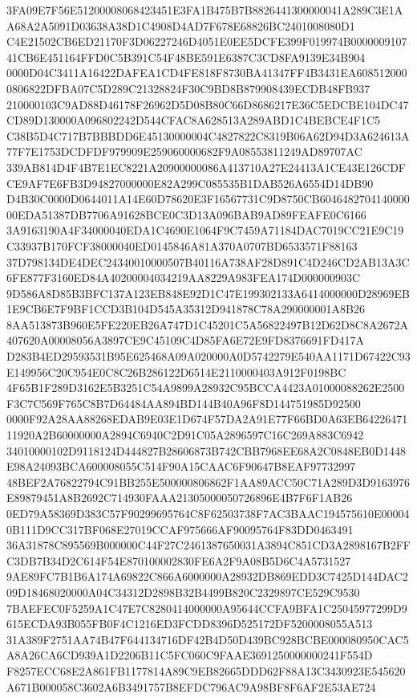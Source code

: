 \documentclass[UTF8,fontset=fandol,zihao=-4,a4paper]{ctexart}
\begin{document}
{{3FA09E7F56E51200008068423451E3FA1B475B7B8826441300000041A289C3E1AA68A2A5091D03638A38D1C4908D4AD7F678E68826BC2401008080D1
C4E21502CB6ED21170F3D06227246D4051E0EE5DCFE399F019974B000000910741CB6E451164FFD0C5B391C54F48BE591E6387C3CD8FA9139E34B904
0000D04C3411A16422DAFEA1CD4FE818F8730BA41347FF4B3431EA6085120000806822DFBA07C5D289C21328824F30C9BD8B879908439ECDB48FB937
210000103C9AD88D46178F26962D5D08B80C66D8686217E36C5EDCBE104DC47CD89D130000A096802242D544CFAC8A628513A289ABD1C4BEBCE4F1C5
C38B5D4C717B7BBBDD6E45130000004C4827822C8319B06A62D94D3A624613A77F7E1753DCDFDF979909E259060000682F9A08553811249AD89707AC
339AB814D4F4B7E1EC8221A20900000086A413710A27E24413A1CE43E126CDFCE9AF7E6FB3D94827000000E82A299C085535B1DAB526A6554D14DB90
D4B30C0000D0644011A14E60D78620E3F16567731C9D8750CB604648270414000000EDA51387DB7706A91628BCE0C3D13A096BAB9AD89FEAFE0C6166
3A9163190A4F34000040EDA1C4690E1064F9C7459A71184DAC7019CC21E9C19C33937B170FCF38000040ED0145846A81A370A0707BD6533571F88163
37D798134DE4DEC24340010000507B40116A738AF28D891C4D246CD2AB13A3C6FE877F3160ED84A40200004034219AA8229A983FEA174D000000903C
9D586A8D85B3BFC137A123EB848E92D1C47E199302133A6414000000D28969EB1E9CB6E7F9BF1CCD3B104D545A35312D941878C78A290000001A8B26
8AA513873B960E5FE220EB26A747D1C45201C5A56822497B12D62D8C8A2672A407620A00008056A3897CE9C45109C4D85FA6E72E9FD8376691FD417A
D283B4ED29593531B95E625468A09A020000A0D5742279E540AA1171D67422C93E149956C20C954E0C8C26B286122D6514E2110000403A912F0198BC
4F65B1F289D3162E5B3251C54A9899A28932C95BCCA4423A01000088262E2500F3C7C569F765C8B7D64484AA894BD144B40A96F8D144751985D92500
0000F92A28AA88268EDAB9E03E1D674F57DA2A91E77F66BD0A63EB6422647111920A2B60000000A2894C6940C2D91C05A2896597C16C269A883C6942
34010000102D9118124D444827B28606873B742CBB7968EE68A2C0848EB0D1448E98A24093BCA600008055C514F90A15CAAC6F90647B8EAF97732997
48BEF2A76822794C91BB255E500000806862F1AA89ACC50C71A289D3D9163976E89879451A8B2692C714930FAAA21305000050726896E4B7F6F1AB26
0ED79A58369D383C57F90299695764C8F62503738F7AC3BAAC194575610E000040B111D9CC317BF068E27019CCAF975666AF90095764F83DD0463491
36A31878C895569B000000C44F27C2461387650031A3894C851CD3A2898167B2FFC3DB7B34D2C614F54E870100002830FE6A2F9A08B5D6C4A5731527
9AE89FC7B1B6A174A69822C866A6000000A28932DB869EDD3C7425D144DAC209D18468020000A04C34312D2898B32B4499B820C2329897CE529C9530
7BAEFEC0F5259A1C47E7C8280414000000A95644CCFA9BFA1C25045977299D9615ECDA93B055FB0F4C1216ED3FCDD8396D525172DF5200008055A513
31A389F2751AA74B47F644134716DF42B4D50D439BC928BCBE000080950CAC5A8A26CA6CD939A1D2206B11C5FC060C9FAAE3691250000000241F554D
F8257ECC68E2A861FB1177814A89C9EB82665DDD62F88A13C3430923E545620A671B000058C3602A6B3491757B8EFDC796AC9A98BF8F6AF2E53AE724
}}
\end{document}
